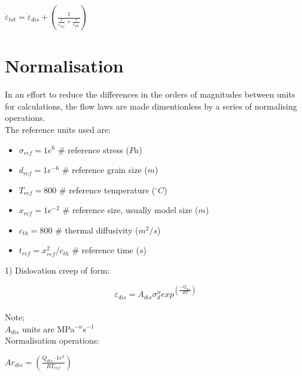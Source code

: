 \documentclass[]{scrreprt}
\begin{document}
$\dot{\varepsilon}_{tot}=\dot{\varepsilon}_{dis}+\left(\frac{1}{\frac{1}{\dot{\varepsilon}_{dif}}+\frac{1}{\dot{\varepsilon}_{gbs}}}\right)$\\

\section{Normalisation}
\label{section:flow_normalisation}

In an effort to reduce the differences in the orders of magnitudes between units for calculations, the flow laws are made dimentionless by a series of normalising operations.\\

The reference units used are:\\

\begin{itemize}
\item $\sigma_{ref} = 1e^6 $ \# reference stress ($Pa$)\\
\item $d_{ref} = 1e^{-6} $ \# reference grain size ($m$)\\
\item $T_{ref} = 800 $ \# reference temperature ($^{\circ} C$)\\
\item $x_{ref} = 1e^{-2} $ \# reference size, usually model size ($m$)\\
\item $c_{th} = 800 $ \# thermal diffusivity ($m^2/s$)\\
\item $t_{ref} = x_{ref}^2/c_{th}$ \# reference time ($s$)\\
\end{itemize}

1) Dislocation creep of form:

\begin{equation}
 \label{eq:dislocation_creep}
\dot{\varepsilon}_{dis} = A_{dis} \sigma_d^n exp^{\left(\frac{-Q_{dis}}{RT}\right)}
\end{equation}\\

Note;\\

$A_{dis}$ units are MPa$^{-n}$s$^{-1}$\\

Normalisation operations:

$Ar_{dis} = \left(\frac{Q_{dis}\cdot1e^3}{RT_{ref}}\right)$\\
\end{document}
